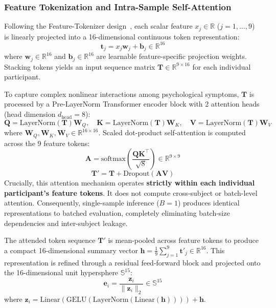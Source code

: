 \documentclass[10pt,letterpaper]{article}
\begin{document}
        \subsubsection*{\textbf{Feature Tokenization and Intra-Sample Self-Attention}}
        Following the Feature-Tokenizer design~\cite{ref_fttransformer}, each scalar feature $x_j \in \mathbb{R}$ ($j=1, \dots, 9$) is linearly projected into a 16-dimensional continuous token representation:
        \begin{equation} \label{eq:tokenization}
        \mathbf{t}_j = x_j \mathbf{w}_j + \mathbf{b}_j \in \mathbb{R}^{16}
        \end{equation}
        where $\mathbf{w}_j \in \mathbb{R}^{16}$ and $\mathbf{b}_j \in \mathbb{R}^{16}$ are learnable feature-specific projection weights. Stacking tokens yields an input sequence matrix $\mathbf{T} \in \mathbb{R}^{9 \times 16}$ for each individual participant.

        To capture complex nonlinear interactions among psychological symptoms, $\mathbf{T}$ is processed by a Pre-LayerNorm Transformer encoder block with 2 attention heads (head dimension $d_{\text{head}} = 8$):
        \begin{equation} \label{eq:qkv_proj}
        \mathbf{Q} = \text{LayerNorm}(\mathbf{T})\mathbf{W}_Q,\quad \mathbf{K} = \text{LayerNorm}(\mathbf{T})\mathbf{W}_K,\quad \mathbf{V} = \text{LayerNorm}(\mathbf{T})\mathbf{W}_V
        \end{equation}
        where $\mathbf{W}_Q, \mathbf{W}_K, \mathbf{W}_V \in \mathbb{R}^{16 \times 16}$. Scaled dot-product self-attention is computed across the 9 feature tokens:
        \begin{equation} \label{eq:attn_weights}
        \mathbf{A} = \text{softmax}\left(\frac{\mathbf{Q}\mathbf{K}^\top}{\sqrt{8}}\right) \in \mathbb{R}^{9 \times 9}
        \end{equation}
        \begin{equation} \label{eq:attn_out}
        \mathbf{T}' = \mathbf{T} + \text{Dropout}(\mathbf{A}\mathbf{V})
        \end{equation}
        Crucially, this attention mechanism operates \textbf{strictly within each individual participant's feature tokens}. It does not compute cross-subject or batch-level attention. Consequently, single-sample inference ($B=1$) produces identical representations to batched evaluation, completely eliminating batch-size dependencies and inter-subject leakage.

        The attended token sequence $\mathbf{T}'$ is mean-pooled across feature tokens to produce a compact 16-dimensional summary vector $\mathbf{h} = \frac{1}{9}\sum_{j=1}^9 \mathbf{t}'_j \in \mathbb{R}^{16}$. This representation is refined through a residual feed-forward block and projected onto the 16-dimensional unit hypersphere $\mathbb{S}^{15}$:
        \begin{equation} \label{eq:l2_norm_m2}
        \mathbf{e}_i = \frac{\mathbf{z}_i}{\|\mathbf{z}_i\|_2} \in \mathbb{S}^{15}
        \end{equation}
        where $\mathbf{z}_i = \text{Linear}(\text{GELU}(\text{LayerNorm}(\text{Linear}(\mathbf{h})))) + \mathbf{h}$.
\end{document}
